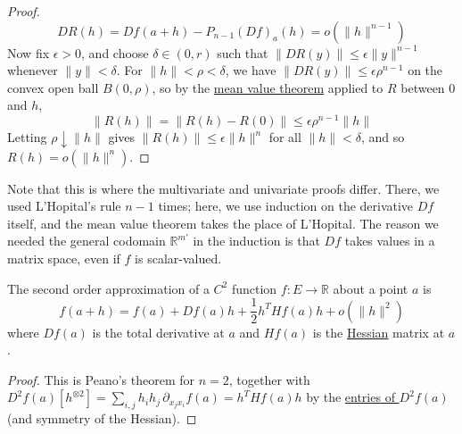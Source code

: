 \begin{proof}
    \begin{equation}
      DR(h) = Df(a + h) - P_{n-1}(Df)_a (h) = o(\|h\|^{n-1})
    \end{equation}
    Now fix $\epsilon > 0$, and choose $\delta \in (0, r)$ such that $\|DR(y)\| \leq \epsilon \|y\|^{n-1}$ whenever $\|y\| < \delta$. For $\|h\| < \rho < \delta$, we have $\|DR(y)\| \leq \epsilon \rho^{n-1}$ on the convex open ball $B(0, \rho)$, so by the \hyperref[thm:mean-value-theorem]{mean value theorem} applied to $R$ between $0$ and $h$, 
    \begin{equation}
      \|R(h)\| = \|R(h) - R(0)\| \leq \epsilon \rho^{n-1} \|h\|
    \end{equation}
    Letting $\rho \downarrow \|h\|$ gives $\|R(h)\| \leq \epsilon \|h\|^n$ for all $\|h\| < \delta$, and so $R(h) = o(\|h\|^n)$. 
  \end{proof}

  Note that this is where the multivariate and univariate proofs differ. There, we used L'Hopital's rule $n-1$ times; here, we use induction on the derivative $Df$ itself, and the mean value theorem takes the place of L'Hopital. The reason we needed the general codomain $\mathbb{R}^{m'}$ in the induction is that $Df$ takes values in a matrix space, even if $f$ is scalar-valued. 

  \begin{corollary}
    \label{thm:2nd-order-taylor-polynomial}
    The second order approximation of a $C^2$ function $f: E \to \mathbb{R}$ about a point $a$ is 
    \begin{equation}
      f (a + h) = f(a) + D f(a) h + \frac{1}{2} h^T H f(a) h + o(\|h\|^2)
    \end{equation}
    where $D f(a)$ is the total derivative at $a$ and $H f(a)$ is the \hyperref[def:hessian]{Hessian} matrix at $a$. 
  \end{corollary}
  \begin{proof}
    This is Peano's theorem for $n = 2$, together with $D^2 f(a) [h^{\otimes 2}] = \sum_{i, j} h_i h_j \, \partial_{x_j x_i} f(a) = h^T H f(a) h$ by the \hyperref[def:ck_functions]{entries of $D^2 f(a)$} (and symmetry of the Hessian). 
  \end{proof}

